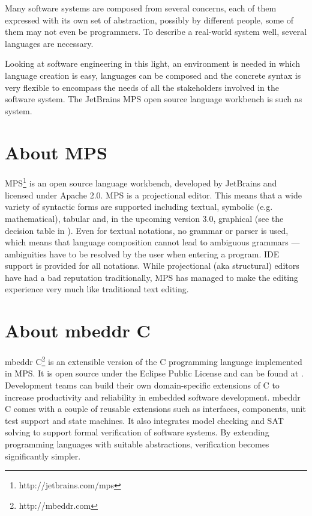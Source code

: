 \documentclass[10pt, conference, compsocconf]{IEEEtran}
\begin{document}
Many software systems are composed from several concerns, each of them expressed
with its own set of abstraction, possibly by different people, some of them may
not even be programmers. To describe a real-world system well, several
languages are necessary.

Looking at software engineering in this light, an environment is needed in
which language creation is easy, languages can be composed and the concrete
syntax is very flexible to encompass the needs of all the stakeholders involved
in the software system. The JetBrains MPS open source language workbench is such
as system.

\section{About MPS}
 
\noindent MPS\footnote{http://jetbrains.com/mps} is an open source language
workbench, developed by JetBrains and licensed under Apache 2.0. MPS is a
projectional editor. This means that a wide variety of syntactic forms are supported including textual, symbolic (e.g.
mathematical), tabular and, in the upcoming version 3.0, graphical (see the
decision table in ). Even for textual notations, no grammar or
parser is used, which means that language composition cannot lead to ambiguous grammars --- ambiguities have to be
resolved by the user when entering a program. IDE support is provided for all
notations. While projectional (aka structural) editors have had a bad reputation
traditionally, MPS has managed to make the editing experience very much like
traditional text editing.
 
\section{About mbeddr C}

\noindent mbeddr C\footnote{http://mbeddr.com} is an extensible version of the C
programming language implemented in MPS. It is open source under the Eclipse Public License and can
be found at . Development teams can build their own
domain-specific extensions of C to increase productivity and reliability in embedded software development. mbeddr C comes with a couple of reusable extensions such as
interfaces, components, unit test support and state machines. It also integrates
model checking and SAT solving to support formal verification of software
systems. By extending programming languages with suitable abstractions,
verification becomes significantly simpler.  
\end{document}
